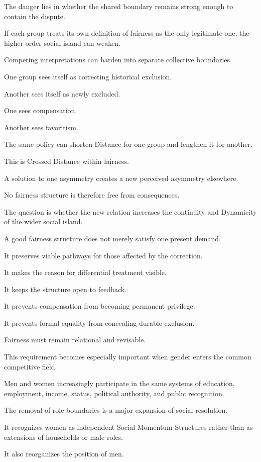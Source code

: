 The danger lies in whether the shared boundary remains strong enough to contain the dispute.

If each group treats its own definition of fairness as the only legitimate one, the higher-order social island can weaken.

Competing interpretations can harden into separate collective boundaries.

One group sees itself as correcting historical exclusion.

Another sees itself as newly excluded.

One sees compensation.

Another sees favoritism.

The same policy can shorten Distance for one group and lengthen it for another.

This is Crossed Distance within fairness.

A solution to one asymmetry creates a new perceived asymmetry elsewhere.

No fairness structure is therefore free from consequences.

The question is whether the new relation increases the continuity and Dynamicity of the wider social island.

A good fairness structure does not merely satisfy one present demand.

It preserves viable pathways for those affected by the correction.

It makes the reason for differential treatment visible.

It keeps the structure open to feedback.

It prevents compensation from becoming permanent privilege.

It prevents formal equality from concealing durable exclusion.

Fairness must remain relational and revisable.

This requirement becomes especially important when gender enters the common competitive field.

Men and women increasingly participate in the same systems of education, employment, income, status, political authority, and public recognition.

The removal of role boundaries is a major expansion of social resolution.

It recognizes women as independent Social Momentum Structures rather than as extensions of households or male roles.

It also reorganizes the position of men.

